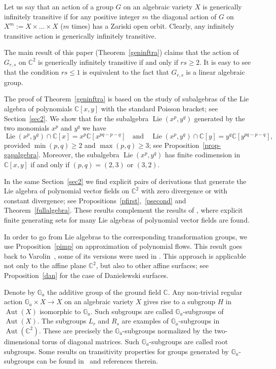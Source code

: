 \documentclass[a4paper,draft,reqno,12pt]{amsart}
\theoremstyle{definition}
\theoremstyle{remark}
\DeclareMathOperator{\lie}{Lie}
\DeclareMathOperator{\Aut}{Aut}
\def\GG{{\mathbb G}}
\def\CC{{\mathbb C}}
\renewcommand{\ge}{\geqslant}
\renewcommand{\le}{\leqslant}
\begin{document}
Let us say that an action of a group $G$ on an algebraic variety $X$ is generically infinitely transitive if for any positive integer $m$ the diagonal action of $G$ on $X^m:=X\times\ldots\times X$ ($m$ times) has a Zariski open orbit. Clearly, any infinitely transitive action is generically infinitely transitive. 

The main result of this paper (Theorem~\ref{geninftra}) claims that the action of $G_{r,s}$ on $\CC^2$ is generically infinitely transitive if and only if $rs\ge 2$. It is easy to see
that the condition $rs\le 1$ is equivalent to the fact that $G_{r,s}$ is a linear algebraic group. 

The proof of Theorem~\ref{geninftra} is based on the study of subalgebras of the Lie algebra of polynomials $\CC[x,y]$ with the standard Poisson bracket; see Section~\ref{sec2}. 
We show that for the subalgebra $\lie(x^p,y^q)$ generated by the two monomials $x^p$ and $y^q$ we have 
$$
\lie(x^p, y^q) \cap \CC[x] = x^{p} \CC[x^{pq - p - q}] \quad \text{and} \quad \lie(x^p, y^q) \cap \CC[y] = y^{q} \CC[y^{pq - p - q}],
$$
provided $\min(p,q) \geq 2$ and $\max(p,q) \geq 3$; see Proposition~\ref{prop-gapalgebra}. Moreover, the subalgebra $\lie(x^p,y^q)$ has finite codimension in $\CC[x,y]$ if and only if
$(p,q)=(2,3)$ or $(3,2)$. 

In the same Section~\ref{sec2} we find explicit pairs of derivations that generate the Lie algebra of polynomial vector fields on $\CC^2$ with zero divergence or with constant divergence; see Propositions~\ref{pfirst},~\ref{psecond} and Theorem~\ref{fullalgebra}. These results complement the results of \cite{An-1, An-2, An-3}, where explicit finite generating sets for many Lie algebras of polynomial vector fields are found.

In order to go from Lie algebras to the corresponding transformation groups, we use Proposition~\ref{pimp} on approximation of polynomial flows. This result goes back to Varolin~\cite{Va}, some of its versions were used in \cite{An-1, An-2, An-3}. This approach is applicable not only to the affine plane $\CC^2$, but also to other affine surfaces; see Proposition~\ref{dan} for the case of Danielewski surfaces. 

Denote by $\GG_a$ the additive group of the ground field $\CC$. Any non-trivial regular action $\GG_a\times X\to X$ on an algebraic variety $X$ gives rise to a subgroup $H$ in
$\Aut(X)$ isomorphic to $\GG_a$. Such subgroups are called $\GG_a$-subgroups of $\Aut(X)$.  The subgroups $L_r$ and  $R_s$ are examples of $\GG_a$-subgroups in $\Aut(\CC^2)$.
These are precisely the $\GG_a$-subgroups normalized by the two-dimensional torus of diagonal matrices. Such $\GG_a$-subgroups are called root subgroups. Some results on transitivity properties for groups generated by $\GG_a$-subgroups can be found in~\cite{A, AFKKZ, AKZ} and references therein. 
\end{document}
